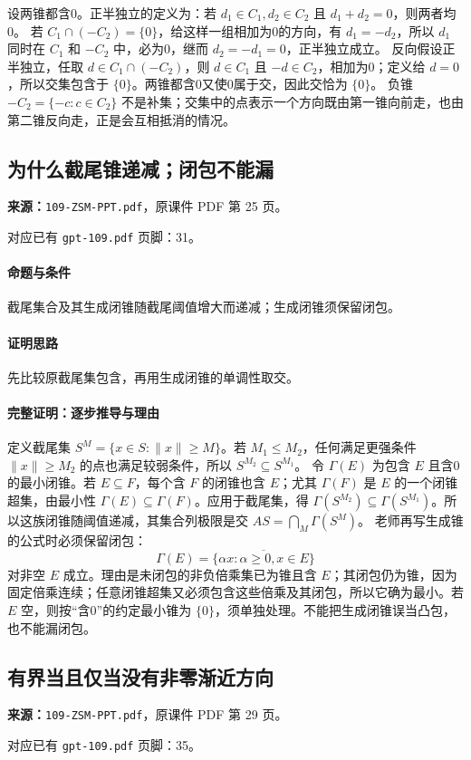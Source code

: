 设两锥都含0。正半独立的定义为：若 $d_1\in C_1,d_2\in C_2$ 且 $d_1+d_2=0$，则两者均0。
若 $C_1\cap(-C_2)=\{0\}$，给这样一组相加为0的方向，有 $d_1=-d_2$，所以 $d_1$ 同时在 $C_1$ 和 $-C_2$ 中，必为0，继而 $d_2=-d_1=0$，正半独立成立。
反向假设正半独立，任取 $d\in C_1\cap(-C_2)$，则 $d\in C_1$ 且 $-d\in C_2$，相加为0；定义给 $d=0$，所以交集包含于 $\{0\}$。两锥都含0又使0属于交，因此交恰为 $\{0\}$。
负锥 $-C_2=\{-c:c\in C_2\}$ 不是补集；交集中的点表示一个方向既由第一锥向前走，也由第二锥反向走，正是会互相抵消的情况。

\clearpage\subsection{为什么截尾锥递减；闭包不能漏}
\textbf{来源：}\texttt{109-ZSM-PPT.pdf}，原课件 PDF 第 25 页。\par
对应已有 \texttt{gpt-109.pdf} 页脚：31。\par
\paragraph{命题与条件}截尾集合及其生成闭锥随截尾阈值增大而递减；生成闭锥须保留闭包。
\paragraph{证明思路}先比较原截尾集包含，再用生成闭锥的单调性取交。
\paragraph{完整证明：逐步推导与理由}

定义截尾集 $S^M=\{x\in S:\|x\|\ge M\}$。若 $M_1\le M_2$，任何满足更强条件 $\|x\|\ge M_2$ 的点也满足较弱条件，所以 $S^{M_2}\subseteq S^{M_1}$。
令 $\Gamma(E)$ 为包含 $E$ 且含0的最小闭锥。若 $E\subseteq F$，每个含 $F$ 的闭锥也含 $E$；尤其 $\Gamma(F)$ 是 $E$ 的一个闭锥超集，由最小性 $\Gamma(E)\subseteq\Gamma(F)$。应用于截尾集，得 $\Gamma(S^{M_2})\subseteq\Gamma(S^{M_1})$。所以这族闭锥随阈值递减，其集合列极限是交 $A S=\bigcap_M\Gamma(S^M)$。
老师再写生成锥的公式时必须保留闭包：
\[\Gamma(E)=\overline{\{\alpha x:\alpha\ge0,x\in E\}}\]
对非空 $E$ 成立。理由是未闭包的非负倍乘集已为锥且含 $E$；其闭包仍为锥，因为固定倍乘连续；任意闭锥超集又必须包含这些倍乘及其闭包，所以它确为最小。若 $E$ 空，则按“含0”的约定最小锥为 $\{0\}$，须单独处理。不能把生成闭锥误当凸包，也不能漏闭包。

\clearpage\subsection{有界当且仅当没有非零渐近方向}
\textbf{来源：}\texttt{109-ZSM-PPT.pdf}，原课件 PDF 第 29 页。\par
对应已有 \texttt{gpt-109.pdf} 页脚：35。\par

